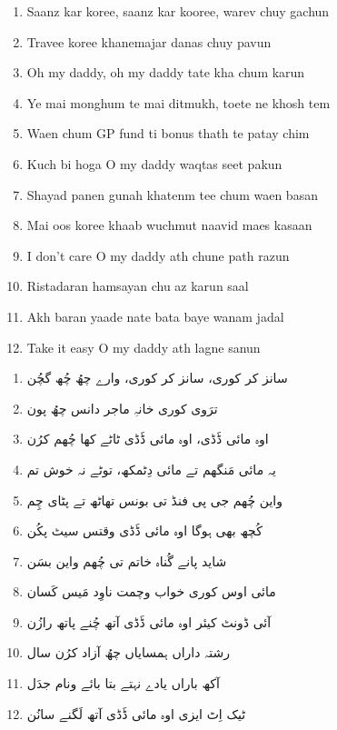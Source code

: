 \documentclass[12pt]{article}
\newcommand{\bigroman}[1]{\fontsize{16pt}{18pt}\selectfont\RaggedRight #1}
\newcommand{\bigarabic}[1]{\fontsize{16pt}{18pt}\selectfont \textarabic{#1}}
\begin{document}
\begin{multicols}{2}
\begin{multicols}{2}
\begin{enumerate}[leftmargin=*, label=\arabic*., font=\fontsize{16pt}{18pt}\selectfont]
  \item \bigroman{Saanz kar koree, saanz kar kooree, warev chuy gachun}
  \item \bigroman{Travee koree khanemajar danas chuy pavun}
  \item \bigroman{Oh my daddy, oh my daddy tate kha chum karun}
  \item \bigroman{Ye mai monghum te mai ditmukh, toete ne khosh tem}
  \item \bigroman{Waen chum GP fund ti bonus thath te patay chim}
  \item \bigroman{Kuch bi hoga O my daddy waqtas seet pakun}
  \item \bigroman{Shayad panen gunah khatenm tee chum waen basan}
  \item \bigroman{Mai oos koree khaab wuchmut naavid maes kasaan}
  \item \bigroman{I don’t care O my daddy ath chune path razun}
  \item \bigroman{Ristadaran hamsayan chu az karun saal}
  \item \bigroman{Akh baran yaade nate bata baye wanam jadal}
  \item \bigroman{Take it easy O my daddy ath lagne sanun}
\end{enumerate}

\columnbreak

\begin{RTL}
\begin{enumerate}[leftmargin=*, label=\arabic*., font=\fontsize{16pt}{18pt}\selectfont]
  \item \bigarabic{سانز کر کوری، سانز کر کوری، وارے چھُ چُھ گچُن}
  \item \bigarabic{ترَوی کوری خانہِ ماجر دانس چھُ پون}
  \item \bigarabic{اوہ مائی ڈَڈی، اوہ مائی ڈَڈی ٹاٹے کھا چُھم کرُن}
  \item \bigarabic{یہ مائی مَنگھم تے مائی دِٹمکھ، توٹے نہ خوش تم}
  \item \bigarabic{واین چُھم جی پی فنڈ تی بونس تھاٹھ تے پٹای چِم}
  \item \bigarabic{کُچھ بھی ہوگا اوہ مائی ڈَڈی وقتس سیٹ پکُن}
  \item \bigarabic{شاید پانے گُناہ خاتم تی چُھم واین بسَن}
  \item \bigarabic{مائی اوس کوری خواب وچمت ناوِد مَیس کَسان}
  \item \bigarabic{آئی ڈونٹ کیئر اوہ مائی ڈَڈی آتھ چُنے پاتھ رازُن}
  \item \bigarabic{رشتہ داراں ہمسایاں چھُ آزاد کرُن سال}
  \item \bigarabic{آکھ باراں یادے نہتے بتا بائے ونام جدَل}
  \item \bigarabic{ٹیک اِٹ ایزی اوہ مائی ڈَڈی آتھ لَگنے سانُن}
\end{enumerate}
\end{RTL}
\end{multicols}


\end{multicols}
\end{document}
